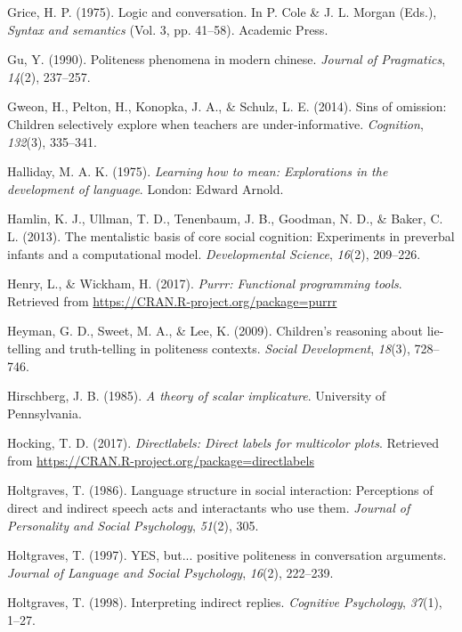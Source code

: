 \documentclass[oneside]{report}
\begin{document}
\hypertarget{ref-grice1975}{}
Grice, H. P. (1975). Logic and conversation. In P. Cole \& J. L. Morgan
(Eds.), \emph{Syntax and semantics} (Vol. 3, pp. 41--58). Academic
Press.

\hypertarget{ref-gu1990}{}
Gu, Y. (1990). Politeness phenomena in modern chinese. \emph{Journal of
Pragmatics}, \emph{14}(2), 237--257.

\hypertarget{ref-gweon2014}{}
Gweon, H., Pelton, H., Konopka, J. A., \& Schulz, L. E. (2014). Sins of
omission: Children selectively explore when teachers are
under-informative. \emph{Cognition}, \emph{132}(3), 335--341.

\hypertarget{ref-halliday1975}{}
Halliday, M. A. K. (1975). \emph{Learning how to mean: Explorations in
the development of language}. London: Edward Arnold.

\hypertarget{ref-hamlin2013mentalistic}{}
Hamlin, K. J., Ullman, T. D., Tenenbaum, J. B., Goodman, N. D., \&
Baker, C. L. (2013). The mentalistic basis of core social cognition:
Experiments in preverbal infants and a computational model.
\emph{Developmental Science}, \emph{16}(2), 209--226.

\hypertarget{ref-R-purrr}{}
Henry, L., \& Wickham, H. (2017). \emph{Purrr: Functional programming
tools}. Retrieved from \url{https://CRAN.R-project.org/package=purrr}

\hypertarget{ref-heyman2009}{}
Heyman, G. D., Sweet, M. A., \& Lee, K. (2009). Children's reasoning
about lie-telling and truth-telling in politeness contexts. \emph{Social
Development}, \emph{18}(3), 728--746.

\hypertarget{ref-hirschberg1985}{}
Hirschberg, J. B. (1985). \emph{A theory of scalar implicature}.
University of Pennsylvania.

\hypertarget{ref-R-directlabels}{}
Hocking, T. D. (2017). \emph{Directlabels: Direct labels for multicolor
plots}. Retrieved from
\url{https://CRAN.R-project.org/package=directlabels}

\hypertarget{ref-holtgraves1986}{}
Holtgraves, T. (1986). Language structure in social interaction:
Perceptions of direct and indirect speech acts and interactants who use
them. \emph{Journal of Personality and Social Psychology}, \emph{51}(2),
305.

\hypertarget{ref-holtgraves1997}{}
Holtgraves, T. (1997). YES, but... positive politeness in conversation
arguments. \emph{Journal of Language and Social Psychology},
\emph{16}(2), 222--239.

\hypertarget{ref-holtgraves1998}{}
Holtgraves, T. (1998). Interpreting indirect replies. \emph{Cognitive
Psychology}, \emph{37}(1), 1--27.
\end{document}
